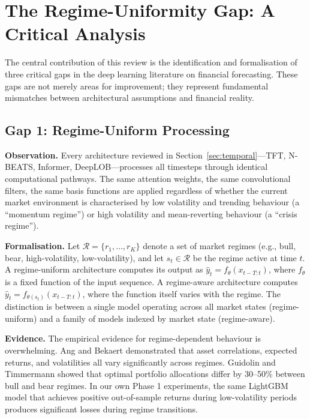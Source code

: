 \documentclass[conference]{IEEEtran}
\begin{document}
\section{The Regime-Uniformity Gap: A Critical Analysis}
\label{sec:gap}

The central contribution of this review is the identification and formalisation of three critical gaps in the deep learning literature on financial forecasting. These gaps are not merely areas for improvement; they represent fundamental mismatches between architectural assumptions and financial reality.

\subsection{Gap 1: Regime-Uniform Processing}

\textbf{Observation.} Every architecture reviewed in Section~\ref{sec:temporal}---TFT, N-BEATS, Informer, DeepLOB---processes all timesteps through identical computational pathways. The same attention weights, the same convolutional filters, the same basis functions are applied regardless of whether the current market environment is characterised by low volatility and trending behaviour (a ``momentum regime'') or high volatility and mean-reverting behaviour (a ``crisis regime'').

\textbf{Formalisation.} Let $\mathcal{R} = \{r_1, \ldots, r_K\}$ denote a set of market regimes (e.g., bull, bear, high-volatility, low-volatility), and let $s_t \in \mathcal{R}$ be the regime active at time $t$. A regime-uniform architecture computes its output as $\hat{y}_t = f_\theta(x_{t-T:t})$, where $f_\theta$ is a fixed function of the input sequence. A regime-aware architecture computes $\hat{y}_t = f_{\theta(s_t)}(x_{t-T:t})$, where the function itself varies with the regime. The distinction is between a single model operating across all market states (regime-uniform) and a family of models indexed by market state (regime-aware).

\textbf{Evidence.} The empirical evidence for regime-dependent behaviour is overwhelming. Ang and Bekaert \cite{ang2002regime} demonstrated that asset correlations, expected returns, and volatilities all vary significantly across regimes. Guidolin and Timmermann \cite{guidolin2007asset} showed that optimal portfolio allocations differ by 30--50\% between bull and bear regimes. In our own Phase 1 experiments, the same LightGBM model that achieves positive out-of-sample returns during low-volatility periods produces significant losses during regime transitions.
\end{document}
